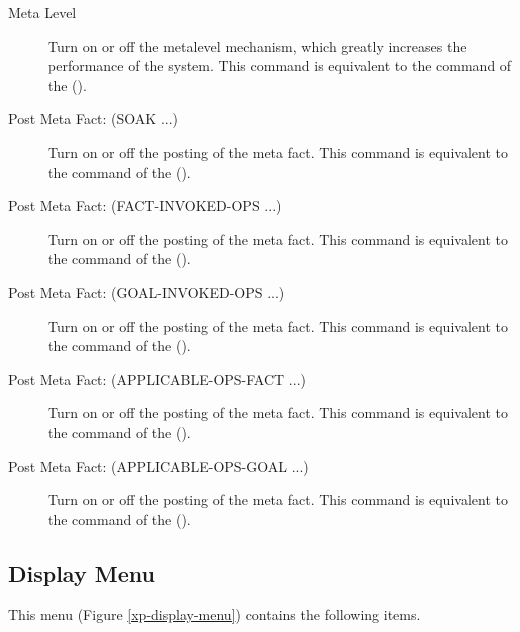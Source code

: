 \begin{description}

\item[Meta Level] Turn on or off the metalevel mechanism, which
greatly increases the performance of the system. This command is
equivalent to the  command of the \CPK{}
().

\item[Post Meta Fact: (SOAK ...)] Turn on or off the posting of the
 meta fact. This command is equivalent to the  command of the \CPK{} ().

\item[Post Meta Fact: (FACT-INVOKED-OPS ...)] Turn on or off the
posting of the  meta fact. This command is equivalent
to the  command of the \CPK{} ().

\item[Post Meta Fact: (GOAL-INVOKED-OPS ...)] Turn on or off the
posting of the  meta fact. This command is equivalent
to the  command of the \CPK{} ().

\item[Post Meta Fact: (APPLICABLE-OPS-FACT ...)] Turn on or off the
posting of the  meta fact. This command is
equivalent to the  command of the \CPK{}
().

\item[Post Meta Fact: (APPLICABLE-OPS-GOAL ...)] Turn on or off the
posting of the  meta fact. This command is
equivalent to the  command of the \CPK{}
().

\end{description}

\subsection{Display Menu}


This menu (Figure \ref{xp-display-menu}) contains the following items.




